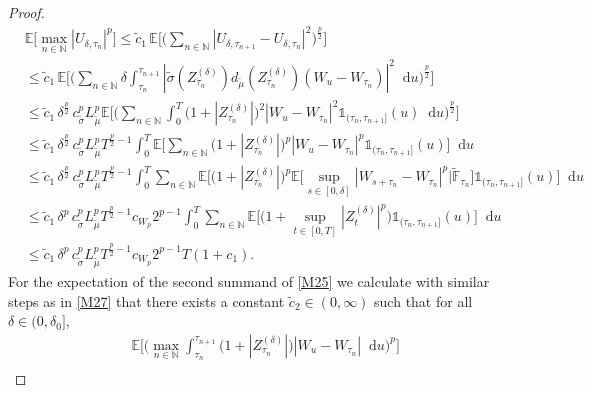 \documentclass[11pt,a4paper]{article}
\numberwithin{equation}{section}
\theoremstyle{definition}
\newcommand{\E}{{\mathbb{E}}}
\newcommand{\N}{{\mathbb{N}}}
\newcommand{\diff}{\mathop{}\!\mathrm{d}}
\begin{document}
\begin{proof}
\begin{equation}
\begin{aligned}
        &\E\Big[\max_{n\in\N} |U_{\delta,\tau_n}|^p\Big] 
        \leq \widetilde c_1\, \E\Big[\Big( \sum_{n\in\N} |U_{\delta, \tau_{n+1}}- U_{\delta, \tau_n}|^2\Big)^{\frac{p}{2}}\Big] \\
        &\leq \widetilde c_1\, \E\Big[\Big( \sum_{n\in\N} \delta \int_{\tau_n}^{\tau_{n+1}} | \widetilde\sigma(Z^{(\delta)}_{\tau_n}) d_{\widetilde\mu}(Z^{(\delta)}_{\tau_n})(W_u - W_{\tau_n}) |^2 \diff u\Big)^{\frac{p}{2}}\Big] \\
        &\leq \widetilde c_1\,\delta^{\frac{p}{2}}\, c_{\widetilde\sigma}^{p} L_{\widetilde\mu}^{p} \E\Big[\Big( \sum_{n\in\N}  \int_{0}^{T} \big(1+|Z^{(\delta)}_{\tau_n}|\big)^2 |W_u - W_{\tau_n}|^2 \mathds{1}_{(\tau_n,\tau_{n+1}]} (u) \diff u\Big)^{\frac{p}{2}}\Big] \\
        &\leq \widetilde c_1\,\delta^{\frac{p}{2}}\, c_{\widetilde\sigma}^{p} L_{\widetilde\mu}^{p} T^{\frac{p}{2}-1} \int_{0}^{T} \E\Big[\sum_{n\in\N}   \big(1+|Z^{(\delta)}_{\tau_n}|\big)^p |W_u - W_{\tau_n}|^p \mathds{1}_{(\tau_n,\tau_{n+1}]} (u) \Big] \diff u\\
        &\leq \widetilde c_1\,\delta^{\frac{p}{2}}\, c_{\widetilde\sigma}^{p} L_{\widetilde\mu}^{p} T^{\frac{p}{2}-1} \int_{0}^{T} \sum_{n\in\N} \E\Big[   \big(1+|Z^{(\delta)}_{\tau_n}|\big)^p \E\big[ \sup_{s\in[0,\delta]} |W_{s+\tau_n} - W_{\tau_n}|^p \big| \widetilde{\mathbb{F}}_{\tau_n} \big] \mathds{1}_{(\tau_n,\tau_{n+1}]} (u) \Big] \diff u\\
        &\leq \widetilde c_1\,\delta^{p}\, c_{\widetilde\sigma}^{p} L_{\widetilde\mu}^{p} T^{\frac{p}{2}-1} c_{W_p} 2^{p-1} \int_{0}^{T}  \sum_{n\in\N} \E\Big[   \big(1+\sup_{t\in[0,T]}|Z^{(\delta)}_{t}|^p\big) \mathds{1}_{(\tau_n,\tau_{n+1}]} (u) \Big] \diff u\\
        &\leq \widetilde c_1\,\delta^{p}\, c_{\widetilde\sigma}^{p} L_{\widetilde\mu}^{p} T^{\frac{p}{2}-1} c_{W_p} 2^{p-1} T(1+c_1).
        \end{aligned}
    \end{equation}
    For the expectation of the second summand of \eqref{M25} we calculate with similar steps as in \eqref{M27} that there exists a constant $\widetilde c_2\in(0,\infty)$ such that for all $\delta\in(0,\delta_0]$,
    \begin{equation}\label{M29}
        \begin{aligned}
        & \E\Big[\Big( \max_{n\in\N} \int_{\tau_n}^{\tau_{n+1}} \big( 1 +  |Z^{(\delta)}_{\tau_n}|\big)|W_u-W_{\tau_n}| \diff u \Big)^p\Big]\\

\end{aligned}
\end{equation}
\end{proof}
\end{document}
